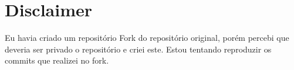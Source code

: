 \chapter{Disclaimer}
\hypertarget{md__r_e_a_d_m_e}{}\label{md__r_e_a_d_m_e}
\label{md__r_e_a_d_m_e_autotoc_md22}%
%
 Eu havia criado um repositório Fork do repositório original, porém percebi que deveria ser privado o repositório e criei este. Estou tentando reproduzir os commits que realizei no fork. 